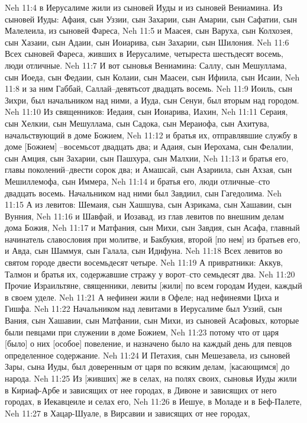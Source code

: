Neh 11:4  в Иерусалиме жили из сыновей Иуды и из сыновей Вениамина. Из сыновей Иуды: Афаия, сын Уззии, сын Захарии, сын Амарии, сын Сафатии, сын Малелеила, из сыновей Фареса,
Neh 11:5  и Маасея, сын Варуха, сын Колхозея, сын Хазаии, сын Адаии, сын Иоиарива, сын Захарии, сын Шилония.
Neh 11:6  Всех сыновей Фареса, живших в Иерусалиме, четыреста шестьдесят восемь, люди отличные.
Neh 11:7  И вот сыновья Вениамина: Саллу, сын Мешуллама, сын Иоеда, сын Федаии, сын Колаии, сын Маасеи, сын Ифиила, сын Исаии,
Neh 11:8  и за ним Габбай, Саллай--девятьсот двадцать восемь.
Neh 11:9  Иоиль, сын Зихри, был начальником над ними, а Иуда, сын Сенуи, был вторым над городом.
Neh 11:10  Из священников: Иедаия, сын Иоиарива, Иахин,
Neh 11:11  Сераия, сын Хелкии, сын Мешуллама, сын Садока, сын Мераиофа, сын Ахитува, начальствующий в доме Божием,
Neh 11:12  и братья их, отправлявшие службу в доме [Божием] --восемьсот двадцать два; и Адаия, сын Иерохама, сын Фелалии, сын Амция, сын Захарии, сын Пашхура, сын Малхии,
Neh 11:13  и братья его, главы поколений--двести сорок два; и Амашсай, сын Азариила, сын Ахзая, сын Мешиллемофа, сын Иммера,
Neh 11:14  и братья его, люди отличные--сто двадцать восемь. Начальником над ними был Завдиил, сын Гагедолима.
Neh 11:15  А из левитов: Шемаия, сын Хашшува, сын Азрикама, сын Хашавии, сын Вунния,
Neh 11:16  и Шавфай, и Иозавад, из глав левитов по внешним делам дома Божия,
Neh 11:17  и Матфания, сын Михи, сын Завдия, сын Асафа, главный начинатель славословия при молитве, и Бакбукия, второй [по нем] из братьев его, и Авда, сын Шаммуя, сын Галала, сын Идифуна.
Neh 11:18  Всех левитов во святом городе двести восемьдесят четыре.
Neh 11:19  А привратники: Аккув, Талмон и братья их, содержавшие стражу у ворот--сто семьдесят два.
Neh 11:20  Прочие Израильтяне, священники, левиты [жили] по всем городам Иудеи, каждый в своем уделе.
Neh 11:21  А нефинеи жили в Офеле; над нефинеями Циха и Гишфа.
Neh 11:22  Начальником над левитами в Иерусалиме был Уззий, сын Вания, сын Хашавии, сын Матфании, сын Михи, из сыновей Асафовых, которые были певцами при служении в доме Божием,
Neh 11:23  потому что от царя [было] о них [особое] повеление, и назначено было на каждый день для певцов определенное содержание.
Neh 11:24  И Петахия, сын Мешезавела, из сыновей Зары, сына Иуды, был доверенным от царя по всяким делам, [касающимся] до народа.
Neh 11:25  Из [живших] же в селах, на полях своих, сыновья Иуды жили в Кириаф-Арбе и зависящих от нее городах, в Дивоне и зависящих от него городах, в Иекавцеиле и селах его,
Neh 11:26  в Иешуе, в Моладе и в Беф-Палете,
Neh 11:27  в Хацар-Шуале, в Вирсавии и зависящих от нее городах,
